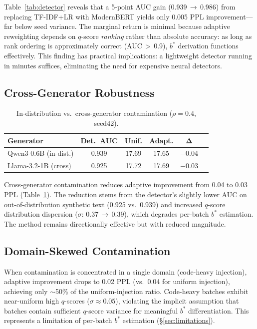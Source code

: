 \documentclass[11pt,a4paper]{article}
\newcommand{\bstar}{b^{*}}
\begin{document}
Table~\ref{tab:detector} reveals that a 5-point AUC gain (0.939\,$\to$\,0.986) from replacing TF-IDF+LR with ModernBERT yields only 0.005 PPL improvement---far below seed variance.
The marginal return is minimal because adaptive reweighting depends on $q$-score \emph{ranking} rather than absolute accuracy: as long as rank ordering is approximately correct (AUC\,$>$\,0.9), $\bstar$ derivation functions effectively.
This finding has practical implications: a lightweight detector running in minutes suffices, eliminating the need for expensive neural detectors.

\subsection{Cross-Generator Robustness}
\label{sec:cross-gen}

\begin{table}[t]
\centering
\small
\caption{In-distribution vs.\ cross-generator contamination ($\rho=0.4$, seed42).}
\label{tab:cross-gen}
\begin{tabular}{lccccc}
\toprule
\textbf{Generator} & \textbf{Det.\ AUC} & \textbf{Unif.} & \textbf{Adapt.} & $\boldsymbol{\Delta}$ \\
\midrule
Qwen3-0.6B (in-dist.) & 0.939 & 17.69 & 17.65 & $-$0.04 \\
Llama-3.2-1B (cross) & 0.925 & 17.72 & 17.69 & $-$0.03 \\
\bottomrule
\end{tabular}
\end{table}

Cross-generator contamination reduces adaptive improvement from 0.04 to 0.03 PPL (Table~\ref{tab:cross-gen}).
The reduction stems from the detector's slightly lower AUC on out-of-distribution synthetic text (0.925 vs.\ 0.939) and increased $q$-score distribution dispersion ($\sigma$: 0.37\,$\to$\,0.39), which degrades per-batch $\bstar$ estimation.
The method remains directionally effective but with reduced magnitude.

\subsection{Domain-Skewed Contamination}
\label{sec:domain-skew}

When contamination is concentrated in a single domain (code-heavy injection), adaptive improvement drops to 0.02 PPL (vs.\ 0.04 for uniform injection), achieving only $\sim$50\% of the uniform-injection ratio.
Code-heavy batches exhibit near-uniform high $q$-scores ($\sigma \approx 0.05$), violating the implicit assumption that batches contain sufficient $q$-score variance for meaningful $\bstar$ differentiation.
This represents a limitation of per-batch $\bstar$ estimation (\S\ref{sec:limitations}).
\end{document}
